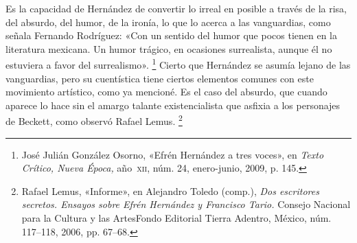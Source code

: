 \documentclass[14pt,twoside,final]{extbook} %
\let\oldfootnote\footnote
\renewcommand\footnote[1]{%
\oldfootnote{\hspace{1mm}#1}}
\begin{document}
Es la capacidad de Hernández de convertir lo irreal en posible a través de la risa, del absurdo, del humor, de la ironía, lo que lo acerca a las vanguardias, como señala Fernando Rodríguez: «Con un sentido del humor que pocos tienen en la literatura mexicana. Un humor trágico, en ocasiones surrealista, aunque él no estuviera a favor del surrealismo».\footnote{José Julián González Osorno, «Efrén Hernández a tres voces», en \emph{Texto Crítico, Nueva Época,} año~\textsc{xii}, núm. 24, enero-junio, 2009, p. 145.} Cierto que Hernández se asumía lejano de las vanguardias, pero su cuentística tiene ciertos elementos comunes con este movimiento artístico, como ya mencioné. Es el caso del absurdo, que cuando aparece lo hace sin el amargo talante existencialista que asfixia a los personajes de Beckett, como observó Rafael Lemus.\footnote{Rafael Lemus, «Informe», en Alejandro Toledo (comp.), \emph{Dos escritores secretos. Ensayos sobre Efrén Hernández y Francisco Tario.} Consejo Nacional para la Cultura y las Artes\kernedslash Fondo Editorial Tierra Adentro, México, núm. 117--118, 2006, pp. 67--68.}
\end{document}
